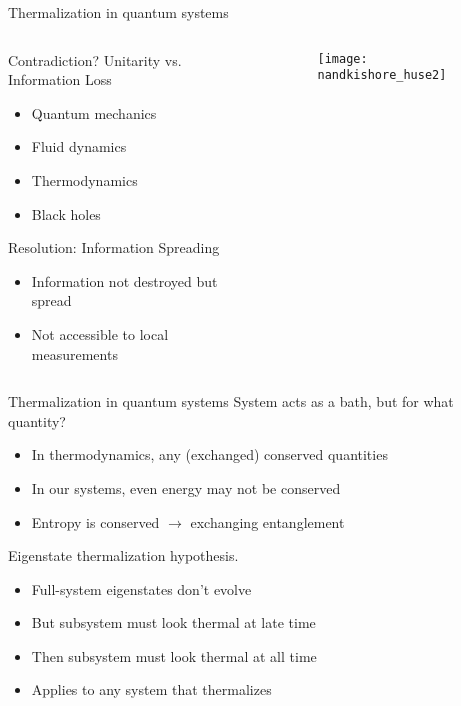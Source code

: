 \documentclass{beamer}
\begin{document}
\begin{frame}{Thermalization in quantum systems}
\begin{columns}
	\begin{column}{0.7\textwidth}  %
	Contradiction? Unitarity vs. Information Loss
	\begin{itemize}
		\item Quantum mechanics
		\item Fluid dynamics
		\item Thermodynamics
		\item Black holes
	\end{itemize}
	Resolution: Information Spreading
	\begin{itemize}
		\item Information not destroyed but spread
		\item Not accessible to local measurements
	\end{itemize}
	\end{column}
	\begin{column}{0.3\textwidth}
		\begin{figure}
			\centering
			\texttt{[image: nandkishore\_huse2]}
		\end{figure}
	\end{column}
\end{columns}
\end{frame}

\begin{frame}{Thermalization in quantum systems}
System acts as a bath, but for what quantity?\\
\begin{itemize}
	\item In thermodynamics, any (exchanged) conserved quantities
	\item In our systems, even energy may not be conserved
	\item Entropy is conserved $\rightarrow$ exchanging entanglement
\end{itemize}
Eigenstate thermalization hypothesis.
\begin{itemize}
	\item Full-system eigenstates don't evolve
	\item But subsystem must look thermal at late time
	\item Then subsystem must look thermal at all time
	\item Applies to any system that thermalizes
\end{itemize}
\end{frame}
\end{document}

